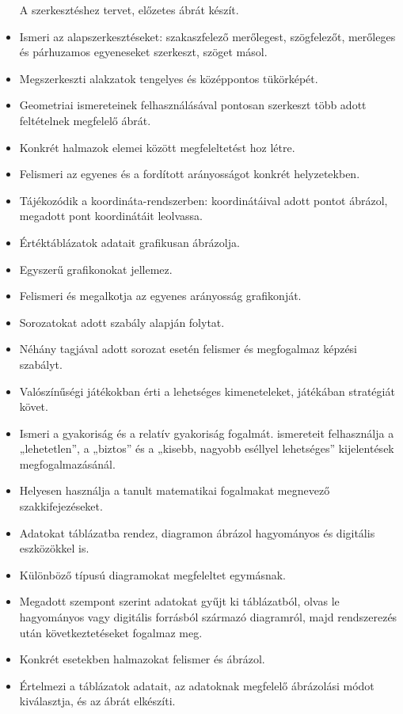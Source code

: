\begin{itemize}
  A szerkesztéshez tervet, előzetes ábrát készít.
\item
  Ismeri az alapszerkesztéseket: szakaszfelező merőlegest, szögfelezőt,
  merőleges és párhuzamos egyeneseket szerkeszt, szöget másol.
\item
  Megszerkeszti alakzatok tengelyes és középpontos tükörképét.
\item
  Geometriai ismereteinek felhasználásával pontosan szerkeszt több adott
  feltételnek megfelelő ábrát.
\item
  Konkrét halmazok elemei között megfeleltetést hoz létre.
\item
  Felismeri az egyenes és a fordított arányosságot konkrét helyzetekben.
\item
  Tájékozódik a koordináta-rendszerben: koordinátáival adott pontot
  ábrázol, megadott pont koordinátáit leolvassa.
\item
  Értéktáblázatok adatait grafikusan ábrázolja.
\item
  Egyszerű grafikonokat jellemez.
\item
  Felismeri és megalkotja az egyenes arányosság grafikonját.
\item
  Sorozatokat adott szabály alapján folytat.
\item
  Néhány tagjával adott sorozat esetén felismer és megfogalmaz képzési
  szabályt.
\item
  Valószínűségi játékokban érti a lehetséges kimeneteleket, játékában
  stratégiát követ.
\item
  Ismeri a gyakoriság és a relatív gyakoriság fogalmát. ismereteit
  felhasználja a „lehetetlen'', a „biztos'' és a „kisebb, nagyobb
  eséllyel lehetséges'' kijelentések megfogalmazásánál.
\item
  Helyesen használja a tanult matematikai fogalmakat megnevező
  szakkifejezéseket.
\item
  Adatokat táblázatba rendez, diagramon ábrázol hagyományos és digitális
  eszközökkel is.
\item
  Különböző típusú diagramokat megfeleltet egymásnak.
\item
  Megadott szempont szerint adatokat gyűjt ki táblázatból, olvas le
  hagyományos vagy digitális forrásból származó diagramról, majd
  rendszerezés után következtetéseket fogalmaz meg.
\item
  Konkrét esetekben halmazokat felismer és ábrázol.
\item
  Értelmezi a táblázatok adatait, az adatoknak megfelelő ábrázolási
  módot kiválasztja, és az ábrát elkészíti.

\end{itemize}
